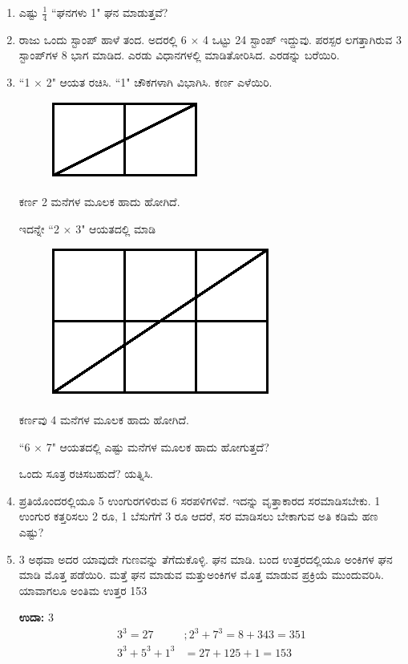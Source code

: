 \begin{enumerate}
\item ಎಷ್ಟು $\frac{1}{4}$ “ಘನಗಳು 1" ಘನ ಮಾಡುತ್ತವೆ?

\item ರಾಜು ಒಂದು ಸ್ಟಾಂಪ್ ಹಾಳೆ ತಂದ. ಅದರಲ್ಲಿ 6 $\times$ 4 ಒಟ್ಟು 24 ಸ್ಟಾಂಪ್ ಇದ್ದುವು. ಪರಸ್ಪರ ಲಗತ್ತಾಗಿರುವ 3 ಸ್ಟಾಂಪ್‌ಗಳ 8 ಭಾಗ ಮಾಡಿದ. ಎರಡು ವಿಧಾನಗಳಲ್ಲಿ ಮಾಡಿತೋರಿಸಿದ. ಎರಡನ್ನು ಬರೆಯಿರಿ.

\item “1 $\times$ 2" ಆಯತ ರಚಿಸಿ. “1" ಚೌಕಗಳಾಗಿ ವಿಭಾಗಿಸಿ. ಕರ್ಣ ಎಳೆಯಿರಿ. 
\begin{figure}[H]
\centering
\includegraphics{images/chap1/q25a.eps}
\end{figure}

ಕರ್ಣ 2 ಮನೆಗಳ ಮೂಲಕ ಹಾದು ಹೋಗಿದೆ.


ಇದನ್ನೇ “2 $\times$ 3" ಆಯತದಲ್ಲಿ ಮಾಡಿ 
\begin{figure}[H]
\centering
\includegraphics{images/chap1/q25b.eps}
\end{figure}

ಕರ್ಣವು 4 ಮನೆಗಳ ಮೂಲಕ ಹಾದು ಹೋಗಿದೆ. 


“6 $\times$ 7" ಆಯತದಲ್ಲಿ ಎಷ್ಟು ಮನೆಗಳ ಮೂಲಕ ಹಾದು ಹೋಗುತ್ತದೆ? 

ಒಂದು ಸೂತ್ರ ರಚಿಸಬಹುದೆ? ಯತ್ನಿಸಿ.

\item ಪ್ರತಿಯೊಂದರಲ್ಲಿಯೂ 5 ಉಂಗುರಗಳಿರುವ 6 ಸರಪಳಿಗಳಿವೆ. ಇದನ್ನು ವೃತ್ತಾಕಾರದ ಸರಮಾಡಿಸಬೇಕು. 1 ಉಂಗುರ ಕತ್ತರಿಸಲು 2 ರೂ, 1 ಬೆಸುಗೆಗೆ 3 ರೂ ಆದರೆ, ಸರ ಮಾಡಿಸಲು ಬೇಕಾಗುವ ಅತಿ ಕಡಿಮೆ ಹಣ ಎಷ್ಟು?

\item 3 ಅಥವಾ ಅದರ ಯಾವುದೇ ಗುಣವನ್ನು ತೆಗೆದುಕೊಳ್ಳಿ. ಘನ ಮಾಡಿ. ಬಂದ ಉತ್ತರದಲ್ಲಿಯೂ ಅಂಕಿಗಳ ಘನ ಮಾಡಿ ಮೊತ್ತ ಪಡೆಯಿರಿ. ಮತ್ತೆ ಘನ ಮಾಡುವ ಮತ್ತು\break ಅಂಕಿಗಳ ಮೊತ್ತ ಮಾಡುವ ಪ್ರಕ್ರಿಯೆ ಮುಂದುವರಿಸಿ. ಯಾವಾಗಲೂ ಅಂತಿಮ ಉತ್ತರ 153

{\bf ಉದಾ:} 3
\begin{align*}
 3^{3} = 27&; 2^{3} + 7^{3} = 8 + 343 = 351\\
3^{3} + 5^{3} + 1^{3} & = 27 + 125 + 1 = 153
\end{align*}


\end{enumerate}
